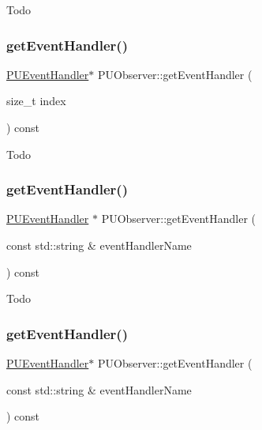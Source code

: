 Todo \mbox{\label{classPUObserver_a7cbf02169d92612a139cc854e37d66d3}} 
\subsubsection{\texorpdfstring{get\+Event\+Handler()}{getEventHandler()}\hspace{0.1cm}{\footnotesize\ttfamily [2/4]}}
{\footnotesize\ttfamily \hyperlink{classPUEventHandler}{P\+U\+Event\+Handler}$\ast$ P\+U\+Observer\+::get\+Event\+Handler (\begin{DoxyParamCaption}\item[{size\+\_\+t}]{index }\end{DoxyParamCaption}) const}

Todo \mbox{\label{classPUObserver_a01846fc48a256d5503703aad243ee813}} 
\subsubsection{\texorpdfstring{get\+Event\+Handler()}{getEventHandler()}\hspace{0.1cm}{\footnotesize\ttfamily [3/4]}}
{\footnotesize\ttfamily \hyperlink{classPUEventHandler}{P\+U\+Event\+Handler} $\ast$ P\+U\+Observer\+::get\+Event\+Handler (\begin{DoxyParamCaption}\item[{const std\+::string \&}]{event\+Handler\+Name }\end{DoxyParamCaption}) const}

Todo \mbox{\label{classPUObserver_a12558402f3021048071e98cf557ff5a4}} 
\subsubsection{\texorpdfstring{get\+Event\+Handler()}{getEventHandler()}\hspace{0.1cm}{\footnotesize\ttfamily [4/4]}}
{\footnotesize\ttfamily \hyperlink{classPUEventHandler}{P\+U\+Event\+Handler}$\ast$ P\+U\+Observer\+::get\+Event\+Handler (\begin{DoxyParamCaption}\item[{const std\+::string \&}]{event\+Handler\+Name }\end{DoxyParamCaption}) const}

